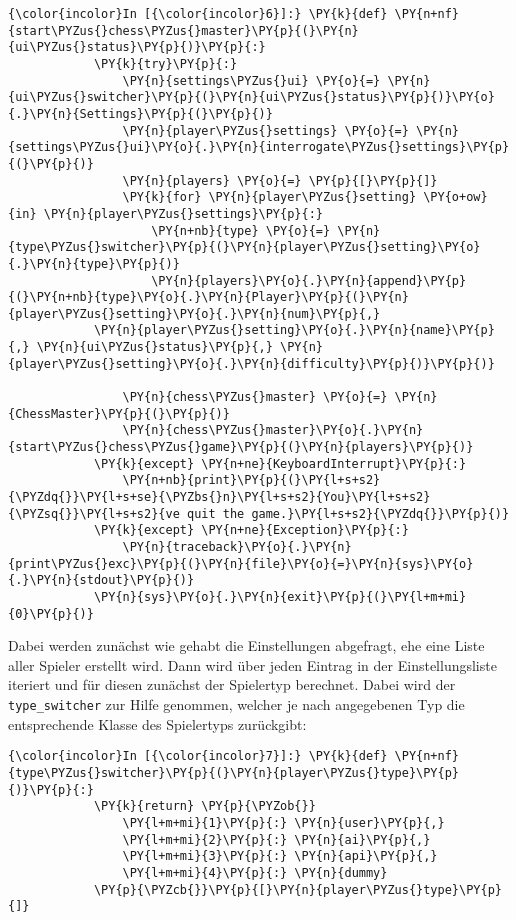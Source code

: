     \begin{Verbatim}[commandchars=\\\{\}]
{\color{incolor}In [{\color{incolor}6}]:} \PY{k}{def} \PY{n+nf}{start\PYZus{}chess\PYZus{}master}\PY{p}{(}\PY{n}{ui\PYZus{}status}\PY{p}{)}\PY{p}{:}    
            \PY{k}{try}\PY{p}{:}
                \PY{n}{settings\PYZus{}ui} \PY{o}{=} \PY{n}{ui\PYZus{}switcher}\PY{p}{(}\PY{n}{ui\PYZus{}status}\PY{p}{)}\PY{o}{.}\PY{n}{Settings}\PY{p}{(}\PY{p}{)}
                \PY{n}{player\PYZus{}settings} \PY{o}{=} \PY{n}{settings\PYZus{}ui}\PY{o}{.}\PY{n}{interrogate\PYZus{}settings}\PY{p}{(}\PY{p}{)}
                \PY{n}{players} \PY{o}{=} \PY{p}{[}\PY{p}{]}
                \PY{k}{for} \PY{n}{player\PYZus{}setting} \PY{o+ow}{in} \PY{n}{player\PYZus{}settings}\PY{p}{:}
                    \PY{n+nb}{type} \PY{o}{=} \PY{n}{type\PYZus{}switcher}\PY{p}{(}\PY{n}{player\PYZus{}setting}\PY{o}{.}\PY{n}{type}\PY{p}{)}
                    \PY{n}{players}\PY{o}{.}\PY{n}{append}\PY{p}{(}\PY{n+nb}{type}\PY{o}{.}\PY{n}{Player}\PY{p}{(}\PY{n}{player\PYZus{}setting}\PY{o}{.}\PY{n}{num}\PY{p}{,} 
			\PY{n}{player\PYZus{}setting}\PY{o}{.}\PY{n}{name}\PY{p}{,} \PY{n}{ui\PYZus{}status}\PY{p}{,} \PY{n}{player\PYZus{}setting}\PY{o}{.}\PY{n}{difficulty}\PY{p}{)}\PY{p}{)}
        
                \PY{n}{chess\PYZus{}master} \PY{o}{=} \PY{n}{ChessMaster}\PY{p}{(}\PY{p}{)}
                \PY{n}{chess\PYZus{}master}\PY{o}{.}\PY{n}{start\PYZus{}chess\PYZus{}game}\PY{p}{(}\PY{n}{players}\PY{p}{)}
            \PY{k}{except} \PY{n+ne}{KeyboardInterrupt}\PY{p}{:}
                \PY{n+nb}{print}\PY{p}{(}\PY{l+s+s2}{\PYZdq{}}\PY{l+s+se}{\PYZbs{}n}\PY{l+s+s2}{You}\PY{l+s+s2}{\PYZsq{}}\PY{l+s+s2}{ve quit the game.}\PY{l+s+s2}{\PYZdq{}}\PY{p}{)}
            \PY{k}{except} \PY{n+ne}{Exception}\PY{p}{:}
                \PY{n}{traceback}\PY{o}{.}\PY{n}{print\PYZus{}exc}\PY{p}{(}\PY{n}{file}\PY{o}{=}\PY{n}{sys}\PY{o}{.}\PY{n}{stdout}\PY{p}{)}
            \PY{n}{sys}\PY{o}{.}\PY{n}{exit}\PY{p}{(}\PY{l+m+mi}{0}\PY{p}{)}
\end{Verbatim}

    Dabei werden zunächst wie gehabt die Einstellungen abgefragt, ehe eine
Liste aller Spieler erstellt wird. Dann wird über jeden Eintrag in der
Einstellungsliste iteriert und für diesen zunächst der Spielertyp
berechnet. Dabei wird der \texttt{type\_switcher} zur Hilfe genommen,
welcher je nach angegebenen Typ die entsprechende Klasse des Spielertyps
zurückgibt:

    \begin{Verbatim}[commandchars=\\\{\}]
{\color{incolor}In [{\color{incolor}7}]:} \PY{k}{def} \PY{n+nf}{type\PYZus{}switcher}\PY{p}{(}\PY{n}{player\PYZus{}type}\PY{p}{)}\PY{p}{:}
            \PY{k}{return} \PY{p}{\PYZob{}}
                \PY{l+m+mi}{1}\PY{p}{:} \PY{n}{user}\PY{p}{,}
                \PY{l+m+mi}{2}\PY{p}{:} \PY{n}{ai}\PY{p}{,}
                \PY{l+m+mi}{3}\PY{p}{:} \PY{n}{api}\PY{p}{,}
                \PY{l+m+mi}{4}\PY{p}{:} \PY{n}{dummy}
            \PY{p}{\PYZcb{}}\PY{p}{[}\PY{n}{player\PYZus{}type}\PY{p}{]}
\end{Verbatim}

